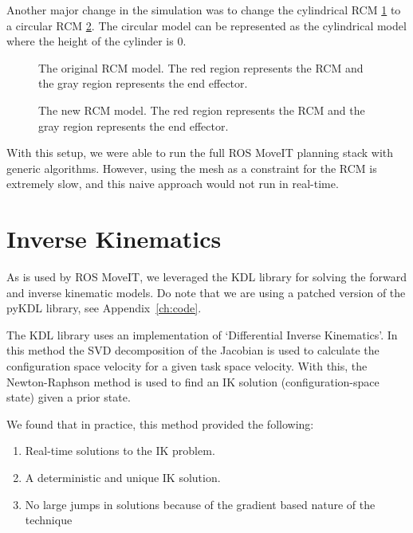 \documentclass[BTech]{iitmdiss}
\begin{document}
    Another major change in the simulation was to change the cylindrical RCM \ref{fig:rcm_cylinder} to a circular RCM \ref{fig:rcm_circle}.
    The circular model can be represented as the cylindrical model where the height of the cylinder is 0.

    \begin{figure}
        \centering
        
        \caption{The original RCM model. The red region represents the RCM and the gray region represents the end effector.}
        \label{fig:rcm_cylinder}
    \end{figure}

    \begin{figure}
        \centering
        
        \caption{The new RCM model. The red region represents the RCM and the gray region represents the end effector.}
        \label{fig:rcm_circle}
    \end{figure}

    With this setup, we were able to run the full ROS MoveIT planning stack with generic algorithms.
    However, using the mesh as a constraint for the RCM is extremely slow, and this naive approach would not run in real-time.


    \section{Inverse Kinematics}

    As is used by ROS MoveIT, we leveraged the KDL library for solving the forward and inverse kinematic models.
    Do note that we are using a patched version of the pyKDL library, see Appendix~\ref{ch:code}.

    The KDL library uses an implementation of `Differential Inverse Kinematics'.
    In this method the SVD decomposition of the Jacobian is used to calculate the configuration space velocity for a given task space velocity.
    With this, the Newton-Raphson method is used to find an IK solution (configuration-space state) given a prior state.

    We found that in practice, this method provided the following:
    \begin{enumerate}
        \item Real-time solutions to the IK problem.
        \item A deterministic and unique IK solution.
        \item No large jumps in solutions because of the gradient based nature of the technique
    \end{enumerate}
\end{document}
